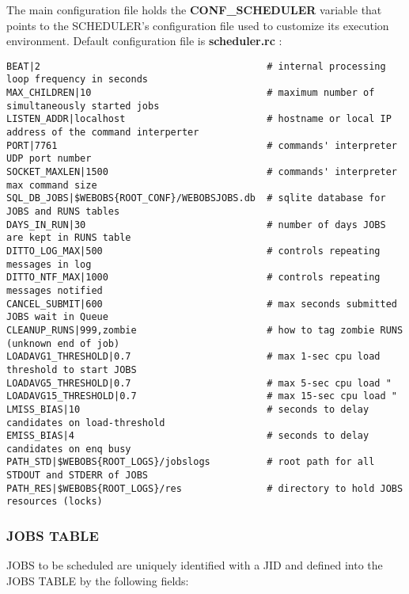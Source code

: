 The main configuration file  holds the \textbf{CONF\_SCHEDULER} variable that points to the SCHEDULER's configuration file used to 
customize its execution environment. Default configuration file is \textbf{scheduler.rc} :

\begin{lstlisting}[title=\wofile{scheduler.rc}]
BEAT|2                                        # internal processing loop frequency in seconds
MAX_CHILDREN|10                               # maximum number of simultaneously started jobs
LISTEN_ADDR|localhost                         # hostname or local IP address of the command interperter
PORT|7761                                     # commands' interpreter UDP port number
SOCKET_MAXLEN|1500                            # commands' interpreter max command size 
SQL_DB_JOBS|$WEBOBS{ROOT_CONF}/WEBOBSJOBS.db  # sqlite database for JOBS and RUNS tables
DAYS_IN_RUN|30                                # number of days JOBS are kept in RUNS table
DITTO_LOG_MAX|500                             # controls repeating messages in log
DITTO_NTF_MAX|1000                            # controls repeating messages notified
CANCEL_SUBMIT|600                             # max seconds submitted JOBS wait in Queue
CLEANUP_RUNS|999,zombie                       # how to tag zombie RUNS (unknown end of job)
LOADAVG1_THRESHOLD|0.7                        # max 1-sec cpu load threshold to start JOBS 
LOADAVG5_THRESHOLD|0.7                        # max 5-sec cpu load "
LOADAVG15_THRESHOLD|0.7                       # max 15-sec cpu load "
LMISS_BIAS|10                                 # seconds to delay candidates on load-threshold
EMISS_BIAS|4                                  # seconds to delay candidates on enq busy 
PATH_STD|$WEBOBS{ROOT_LOGS}/jobslogs          # root path for all STDOUT and STDERR of JOBS
PATH_RES|$WEBOBS{ROOT_LOGS}/res               # directory to hold JOBS resources (locks)
\end{lstlisting}


\subsubsection{JOBS TABLE}

JOBS to be scheduled are uniquely identified with a JID and defined into the JOBS TABLE by the following fields:

